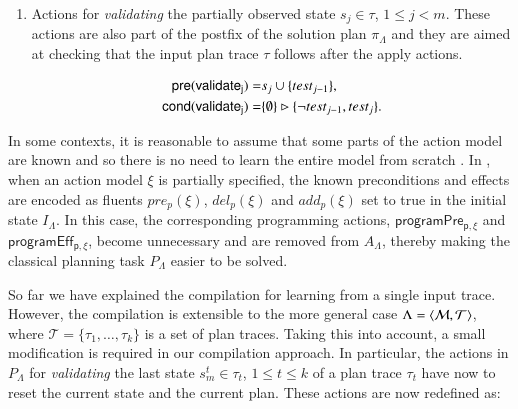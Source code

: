 \begin{itemize}
\begin{enumerate}
\item Actions for {\em validating} the partially observed state $s_j\in\tau$, {\tt\small $1\leq j< m$}. These actions are also part of the postfix of the solution plan $\pi_\Lambda$ and they are aimed at checking that the input plan trace $\tau$ follows after the apply actions.


\begin{small}
\begin{align*}
\hspace*{7pt}\mathsf{pre}(\mathsf{validate_{j}})=&s_j\cup\{test_{j-1}\},\\
\mathsf{cond}(\mathsf{validate_{j}})=&\{\emptyset\}\rhd\{\neg test_{j-1}, test_j\}.
\end{align*}
\end{small}
\end{enumerate}
\end{itemize}


In some contexts, it is reasonable to assume that some parts of the action model are known and so there is no need to learn the entire model from scratch \cite{ZhuoNK13}. In \FAMA, when an action model $\xi$ is partially specified, the known preconditions and effects are encoded as fluents $pre_p(\xi)$, $del_p(\xi)$ and $add_p(\xi)$ set to true in the initial state $I_{\Lambda}$. In this case, the corresponding programming actions, $\mathsf{programPre_{p,\xi}}$ and $\mathsf{programEff_{p,\xi}}$, become unnecessary and are removed from $A_{\Lambda}$, thereby making the classical planning task $P_{\Lambda}$ easier to be solved.


So far we have explained the compilation for learning from a single input trace. However, the compilation is extensible to the more general case $\Lambda={\langle \mathcal{M},\mathcal{T} \rangle}$, where $\mathcal{T}=\{\tau_1,\ldots,\tau_k\}$ is a set of plan traces. Taking this into account, a small modification is required in our compilation approach. In particular, the actions in $P_{\Lambda}$ for {\em validating} the last state $s_m^t\in \tau_t$, {\tt\small $1\leq t\leq k$} of a plan trace $\tau_t$ have now to reset the current state and the current plan. These actions are now redefined as:


